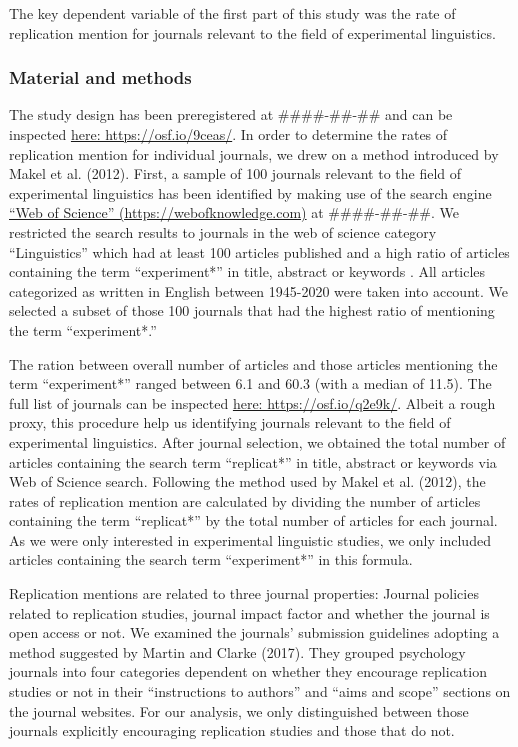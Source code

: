 \documentclass[]{elsarticle} %
\begin{document}
The key dependent variable of the first part of this study was the rate
of replication mention for journals relevant to the field of
experimental linguistics.

\hypertarget{material-and-methods}{%
\subsubsection{Material and methods}\label{material-and-methods}}

The study design has been preregistered at \#\#\#\#-\#\#-\#\# and can be
inspected \href{https://osf.io/9ceas/}{here: https://osf.io/9ceas/}. In
order to determine the rates of replication mention for individual
journals, we drew on a method introduced by Makel et al. (2012). First,
a sample of 100 journals relevant to the field of experimental
linguistics has been identified by making use of the search engine
\href{https://webofknowledge.com}{``Web of Science''
(https://webofknowledge.com)} at \#\#\#\#-\#\#-\#\#. We restricted the
search results to journals in the web of science category
``Linguistics'' which had at least 100 articles published and a high
ratio of articles containing the term ``experiment*'' in title, abstract
or keywords . All articles categorized as written in English between
1945-2020 were taken into account. We selected a subset of those 100
journals that had the highest ratio of mentioning the term
``experiment*.''

The ration between overall number of articles and those articles
mentioning the term ``experiment*'' ranged between 6.1 and 60.3 (with a
median of 11.5). The full list of journals can be inspected
\href{https://osf.io/q2e9k/}{here: https://osf.io/q2e9k/}. Albeit a
rough proxy, this procedure help us identifying journals relevant to the
field of experimental linguistics. After journal selection, we obtained
the total number of articles containing the search term ``replicat*'' in
title, abstract or keywords via Web of Science search. Following the
method used by Makel et al. (2012), the rates of replication mention are
calculated by dividing the number of articles containing the term
``replicat*'' by the total number of articles for each journal. As we
were only interested in experimental linguistic studies, we only
included articles containing the search term ``experiment*'' in this
formula.

Replication mentions are related to three journal properties: Journal
policies related to replication studies, journal impact factor and
whether the journal is open access or not. We examined the journals'
submission guidelines adopting a method suggested by Martin and Clarke
(2017). They grouped psychology journals into four categories dependent
on whether they encourage replication studies or not in their
``instructions to authors'' and ``aims and scope'' sections on the
journal websites. For our analysis, we only distinguished between those
journals explicitly encouraging replication studies and those that do
not.
\end{document}
